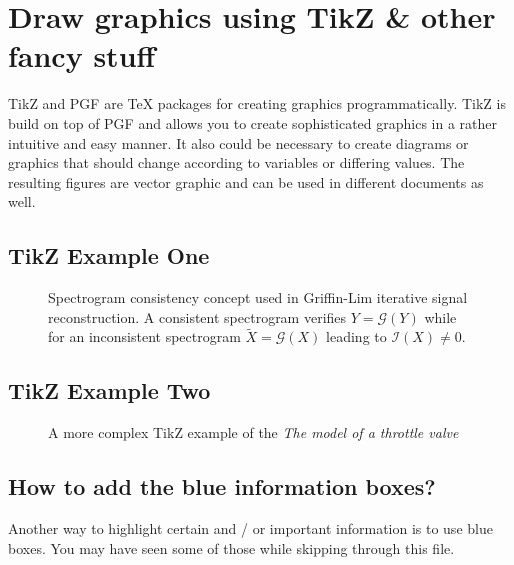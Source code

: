 \chapter{Draw graphics using TikZ \& other fancy stuff}

TikZ and PGF are TeX packages for creating graphics programmatically. TikZ is build on top of PGF and allows you to create sophisticated graphics in a rather intuitive and easy manner. It also could be necessary to create diagrams or graphics that should change according to variables or differing values. The resulting figures are vector graphic and can be used in different documents as well.

\section{TikZ Example One}

\begin{figure}[h]
	\center %
	\footnotesize{}
	\caption{Spectrogram consistency concept used in Griffin-Lim iterative signal reconstruction. A consistent spectrogram verifies $Y=\mathcal{G}(Y)$ while for an inconsistent spectrogram $\widetilde{X}=\mathcal{G}(X)$ leading to $\mathcal{I}({X})\neq{0}$.}\label{figExOne}
\end{figure}

\begin{mdframed}
	
\end{mdframed}


\section{TikZ Example Two}
\begin{figure}[h]
	\center %
	\footnotesize{}
	\caption{A more complex TikZ example of the \emph{The model of a throttle valve}}\label{figExTwo}
\end{figure}

\begin{mdframed}
	
\end{mdframed}

\section{How to add the blue information boxes?}
Another way to highlight certain and / or important information is to use blue boxes. You may have seen some of those while skipping through this file.

